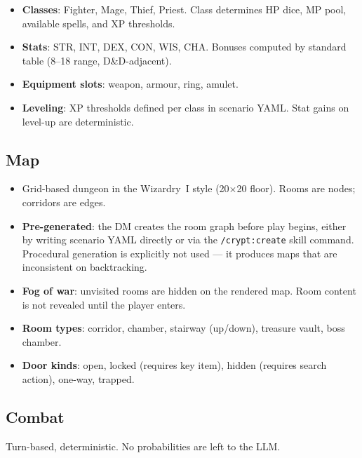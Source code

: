 \documentclass[a4paper,10pt]{article}
\newcommand{\cmd}[1]{\texttt{#1}}
\begin{document}
\begin{itemize}
  \item \textbf{Classes}: Fighter, Mage, Thief, Priest.
    Class determines HP dice, MP pool, available spells, and XP
    thresholds.
  \item \textbf{Stats}: STR, INT, DEX, CON, WIS, CHA.
    Bonuses computed by standard table (8--18 range, D\&D-adjacent).
  \item \textbf{Equipment slots}: weapon, armour, ring, amulet.
  \item \textbf{Leveling}: XP thresholds defined per class in
    scenario YAML.  Stat gains on level-up are deterministic.
\end{itemize}

\subsection{Map}

\begin{itemize}
  \item Grid-based dungeon in the Wizardry~I style (20$\times$20
    floor).  Rooms are nodes; corridors are edges.
  \item \textbf{Pre-generated}: the DM creates the room graph before
    play begins, either by writing scenario YAML directly or via the
    \cmd{/crypt:create} skill command.  Procedural generation is
    explicitly not used --- it produces maps that are inconsistent on
    backtracking.
  \item \textbf{Fog of war}: unvisited rooms are hidden on the rendered
    map.  Room content is not revealed until the player enters.
  \item \textbf{Room types}: corridor, chamber, stairway (up/down),
    treasure vault, boss chamber.
  \item \textbf{Door kinds}: open, locked (requires key item),
    hidden (requires search action), one-way, trapped.
\end{itemize}

\subsection{Combat}

Turn-based, deterministic.  No probabilities are left to the LLM.
\end{document}
